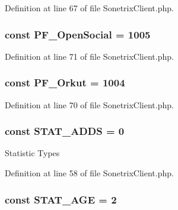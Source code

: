 Definition at line 67 of file SonetrixClient.php.

\hypertarget{classSonetrixClient_ad576cd314e932752cf96eae2c0c2e10c}{
\subsubsection[{PF\_\-OpenSocial}]{\setlength{\rightskip}{0pt plus 5cm}const {\bf PF\_\-OpenSocial} = 1005}}
\label{classSonetrixClient_ad576cd314e932752cf96eae2c0c2e10c}


Definition at line 71 of file SonetrixClient.php.

\hypertarget{classSonetrixClient_a6769a04dfc6dfa871e2649b8da5d2bc7}{
\subsubsection[{PF\_\-Orkut}]{\setlength{\rightskip}{0pt plus 5cm}const {\bf PF\_\-Orkut} = 1004}}
\label{classSonetrixClient_a6769a04dfc6dfa871e2649b8da5d2bc7}


Definition at line 70 of file SonetrixClient.php.

\hypertarget{classSonetrixClient_a12804ac5dcb2455ae3119f387641f5aa}{
\subsubsection[{STAT\_\-ADDS}]{\setlength{\rightskip}{0pt plus 5cm}const {\bf STAT\_\-ADDS} = 0}}
\label{classSonetrixClient_a12804ac5dcb2455ae3119f387641f5aa}
Statistic Types 

Definition at line 58 of file SonetrixClient.php.

\hypertarget{classSonetrixClient_a06eba9e43261b72ca95f5030d3cae017}{
\subsubsection[{STAT\_\-AGE}]{\setlength{\rightskip}{0pt plus 5cm}const {\bf STAT\_\-AGE} = 2}}
\label{classSonetrixClient_a06eba9e43261b72ca95f5030d3cae017}


